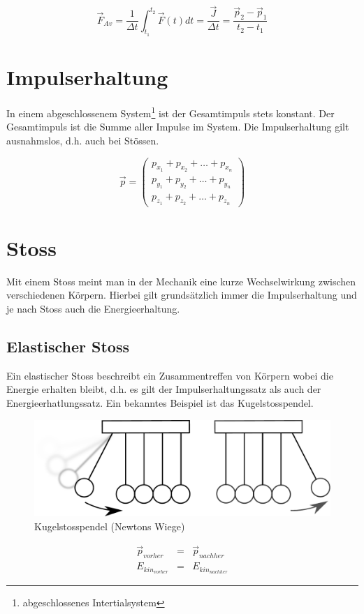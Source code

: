 \[ \boxed{\vec{F}_{Av} = \frac{1}{\Delta t} \int_{t_1}^{t_2} \vec{F}(t)dt = 
	\frac{\vec{J}}{\Delta t} = \frac{\vec{p}_2 - \vec{p}_1}{t_2 - t_1}} \]

\section{Impulserhaltung}
In einem abgeschlossenem System\footnote{abgeschlossenes Intertialsystem} 
ist der Gesamtimpuls stets konstant. Der Gesamtimpuls ist die Summe aller 
Impulse im System. Die Impulserhaltung gilt ausnahmslos, d.h. auch bei 
Stössen.

\[ \vec{p} =
\begin{pmatrix}
	p_{x_1} + p_{x_2} + \dots + p_{x_n} \\
	p_{y_1} + p_{y_2} + \dots + p_{y_n} \\
	p_{z_1} + p_{z_2} + \dots + p_{z_n} 
\end{pmatrix} \]

\section{Stoss}
Mit einem Stoss meint man in der Mechanik eine kurze Wechselwirkung zwischen
verschiedenen Körpern. Hierbei gilt grundsätzlich immer die Impulserhaltung
und je nach Stoss auch die Energieerhaltung.

\subsection{Elastischer Stoss}
Ein elastischer Stoss beschreibt ein Zusammentreffen von Körpern wobei die
Energie erhalten bleibt, d.h. es gilt der Impulserhaltungssatz als auch der
Energieerhatlungssatz. Ein bekanntes Beispiel ist das Kugelstosspendel.

\begin{figure}[h!]
	\centering
	\includegraphics[scale=0.4]{kugelstosspendel.pdf}
	\caption{Kugelstosspendel (Newtons Wiege)}
\end{figure}

\[ \boxed{
	\begin{array}{rcl}
		\vec{p}_{vorher} &= &\vec{p}_{nachher} \\
		E_{kin_{vorher}} &= &E_{kin_{nachher}}
	\end{array}
}\]

